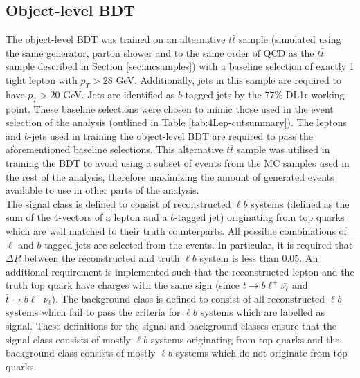 \subsection{Object-level BDT}
\label{sec:object-level-bdt}
The object-level BDT was trained on an alternative $t\bar{t}$ sample (simulated using the same generator, parton shower and to the same order of QCD as the $t\bar{t}$ sample described in Section \ref{sec:mcsamples}) with a baseline selection of exactly 1 tight lepton with $p_{T} > 28$ GeV. Additionally, jets in this sample are required to have $p_{T} > 20$ GeV. Jets are identified as $b$-tagged jets by the $77\%$ DL1r working point. These baseline selections were chosen to mimic those used in the event selection of the analysis (outlined in Table \ref{tab:4Lep-cutsummary}). The leptons and $b$-jets used in training the object-level BDT are required to pass the aforementioned baseline selections. This alternative $t\bar{t}$ sample was utilised in training the BDT to avoid using a subset of events from the MC samples used in the rest of the analysis, therefore maximizing the amount of generated events available to use in other parts of the analysis.\\

The signal class is defined to consist of reconstructed $\ell b$ systems (defined as the sum of the 4-vectors of a lepton and a $b$-tagged jet) originating from top quarks which are well matched to their truth counterparts. All possible combinations of $\ell$ and $b$-tagged jets are selected from the events. In particular, it is required that $\Delta R$ between the reconstructed and truth $\ell b$ system is less than 0.05. An additional requirement is implemented such that the reconstructed lepton and the truth top quark have charges with the same sign (since $t\rightarrow b\ell^{+}\bar{\nu_{\ell}}$ and $\bar{t}\rightarrow \bar{b}\ell^{-}\nu_{\ell}$). The background class is defined to consist of all reconstructed $\ell b$ systems which fail to pass the criteria for $\ell b$ systems which are labelled as signal. These definitions for the signal and background classes ensure that the signal class consists of mostly $\ell b$ systems originating from top quarks and the background class consists of mostly $\ell b$ systems which do not originate from top quarks.\\

